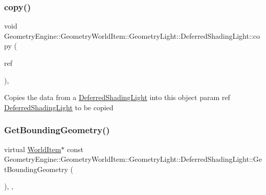 \mbox{\label{class_geometry_engine_1_1_geometry_world_item_1_1_geometry_light_1_1_deferred_shading_light_a7cab39203d583f1a4b14cb8c56fcb85b}} 
\subsubsection{\texorpdfstring{copy()}{copy()}}
{\footnotesize\ttfamily void Geometry\+Engine\+::\+Geometry\+World\+Item\+::\+Geometry\+Light\+::\+Deferred\+Shading\+Light\+::copy (\begin{DoxyParamCaption}\item[{const \mbox{\hyperlink{class_geometry_engine_1_1_geometry_world_item_1_1_geometry_light_1_1_deferred_shading_light}{Deferred\+Shading\+Light}} \&}]{ref }\end{DoxyParamCaption})\hspace{0.3cm}{\ttfamily [protected]}, {\ttfamily [virtual]}}

Copies the data from a \mbox{\hyperlink{class_geometry_engine_1_1_geometry_world_item_1_1_geometry_light_1_1_deferred_shading_light}{Deferred\+Shading\+Light}} into this object param ref \mbox{\hyperlink{class_geometry_engine_1_1_geometry_world_item_1_1_geometry_light_1_1_deferred_shading_light}{Deferred\+Shading\+Light}} to be copied \mbox{\label{class_geometry_engine_1_1_geometry_world_item_1_1_geometry_light_1_1_deferred_shading_light_a742416954d3b05484799e4c1235567b1}} 
\subsubsection{\texorpdfstring{GetBoundingGeometry()}{GetBoundingGeometry()}}
{\footnotesize\ttfamily virtual \mbox{\hyperlink{class_geometry_engine_1_1_geometry_world_item_1_1_world_item}{World\+Item}}$\ast$ const Geometry\+Engine\+::\+Geometry\+World\+Item\+::\+Geometry\+Light\+::\+Deferred\+Shading\+Light\+::\+Get\+Bounding\+Geometry (\begin{DoxyParamCaption}{ }\end{DoxyParamCaption})\hspace{0.3cm}{\ttfamily [inline]}, {\ttfamily [override]}, {\ttfamily [virtual]}}


